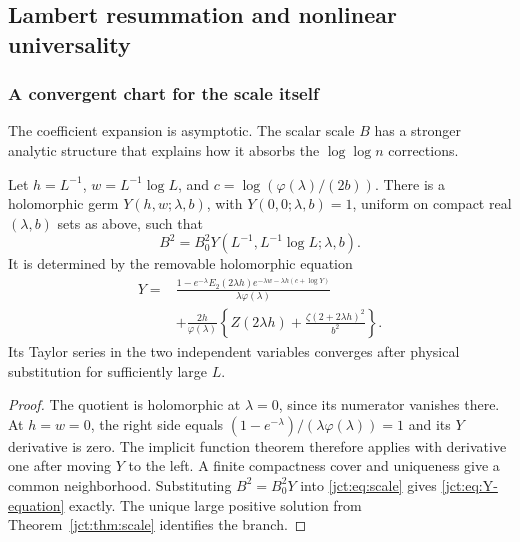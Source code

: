 \subsection{Lambert resummation and nonlinear universality}
\label{jct:sec:universality}

\subsubsection{A convergent chart for the scale itself}

The coefficient expansion is asymptotic. The scalar scale $B$ has a
stronger analytic structure that explains how it absorbs the
$\log\log n$ corrections.

\begin{proposition}
\label{jct:prop:scale-chart}
Let $h=L^{-1}$, $w=L^{-1}\log L$, and
$c=\log(\varphi(\lambda)/(2b))$. There is a holomorphic germ
$Y(h,w;\lambda,b)$, with $Y(0,0;\lambda,b)=1$, uniform on compact
real $(\lambda,b)$ sets as above, such that
\begin{equation}\label{jct:eq:Y-scale}
 B^2=B_0^2Y(L^{-1},L^{-1}\log L;\lambda,b).
\end{equation}
It is determined by the removable holomorphic equation
\begin{equation}\label{jct:eq:Y-equation}
\begin{split}
 Y={}&\frac{1-e^{-\lambda}E_2(2\lambda h)
                e^{-\lambda w-\lambda h(c+\log Y)}}{
                \lambda\varphi(\lambda)}\\
 &+\frac{2h}{\varphi(\lambda)}
   \left\{Z(2\lambda h)+\frac{\zeta(2+2\lambda h)^2}{b^2}\right\}.
\end{split}
\end{equation}
Its Taylor series in the two independent variables converges after
physical substitution for sufficiently large $L$.
\end{proposition}

\begin{proof}
The quotient is holomorphic at $\lambda=0$, since its numerator
vanishes there. At $h=w=0$, the right side equals
$(1-e^{-\lambda})/(\lambda\varphi(\lambda))=1$ and its $Y$
derivative is zero. The implicit function theorem therefore applies
with derivative one after moving $Y$ to the left. A finite compactness
cover and uniqueness give a common neighborhood. Substituting
$B^2=B_0^2Y$ into \eqref{jct:eq:scale} gives
\eqref{jct:eq:Y-equation} exactly. The unique large positive solution
from Theorem~\ref{jct:thm:scale} identifies the branch.
\end{proof}

